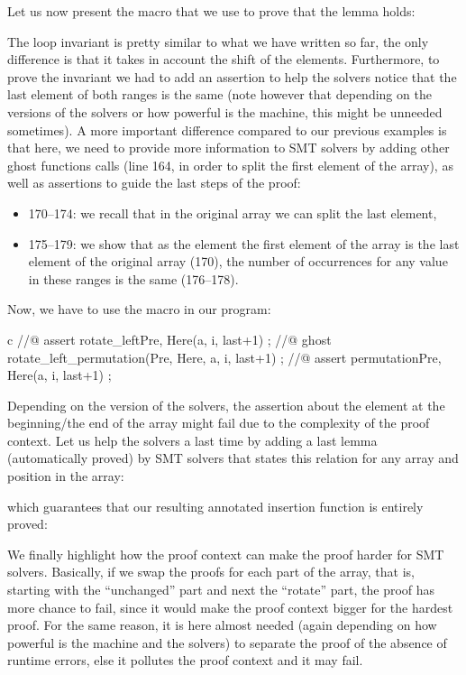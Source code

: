 Let us now present the macro that we use to prove that the lemma holds:




The loop invariant is pretty similar to what we have written so far, the only
difference is that it takes in account the shift of the elements. Furthermore,
to prove the invariant we had to add an assertion to help the solvers notice
that the last element of both ranges is the same (note however that depending
on the versions of the solvers or how powerful is the machine, this might be
unneeded sometimes). A more important difference compared to our previous
examples is that here, we need to provide more information to SMT solvers by
adding other ghost functions calls (line 164, in order to split the first
element of the array), as well as assertions to guide the last steps of the
proof:


\begin{itemize}
\item 170--174: we recall that in the original array we can split the last
  element,
\item 175--179: we show that as the element the first element of the array is
  the last element of the original array (170), the number of occurrences for
  any value in these ranges is the same (176--178).
\end{itemize}


Now, we have to use the macro in our program:


\begin{CodeBlock}{c}
//@ assert rotate_left{Pre, Here}(a, i, last+1) ;
//@ ghost rotate_left_permutation(Pre, Here, a, i, last+1) ;
//@ assert permutation{Pre, Here}(a, i, last+1) ;
\end{CodeBlock}


Depending on the version of the solvers, the assertion about the element
at the beginning/the end of the array might fail due to the complexity of the
proof context. Let us help the solvers a last time by adding a last lemma
(automatically proved) by SMT solvers that states this relation for any array
and position in the array:





which guarantees that our resulting annotated insertion function is entirely
proved:




We finally highlight how the proof context can make the proof harder for SMT
solvers. Basically, if we swap the proofs for each part of the array, that is,
starting with the ``unchanged'' part and next the ``rotate'' part, the proof has
more chance to fail, since it would make the proof context bigger for the
hardest proof. For the same reason, it is here almost needed (again depending
on how powerful is the machine and the solvers) to separate the proof of the
absence of runtime errors, else it pollutes the proof context and it may fail.


